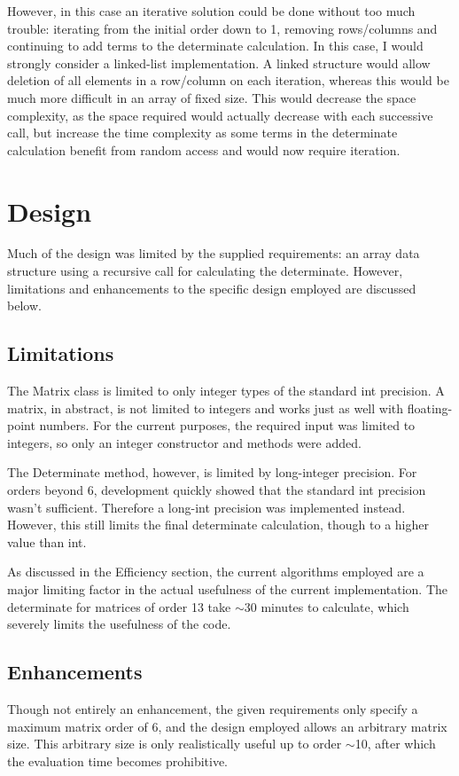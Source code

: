 \documentclass[a4paper,12pt]{article}
\begin{document}
However, in this case an iterative solution could be done without too much trouble: iterating from the initial order down to 1, removing
rows/columns and continuing to add terms to the determinate calculation.  In this case, I would strongly consider a linked-list implementation.  
A linked structure would allow deletion of all elements in a row/column on each iteration, whereas this would be much more difficult in an array of fixed size.  
This would decrease the space complexity, as the space required would actually decrease with each successive call, but increase the
time complexity as some terms in the determinate calculation benefit from random access and would now require iteration. 



\section{Design}
Much of the design was limited by the supplied requirements: an array data structure using a recursive call for calculating the determinate.  However, limitations and enhancements to the specific design employed are discussed below.


\subsection{Limitations}
The Matrix class is limited to only integer types of the standard int precision.  A matrix, in abstract, is not limited to integers and works just as 
well with floating-point numbers.
For the current purposes, the required input was limited to integers, so only an integer constructor and methods were added. 

The Determinate method, however, is limited by long-integer precision.  For orders beyond 6, development quickly showed that
the standard int precision wasn't sufficient.  Therefore a long-int precision was implemented instead.  However, this still limits the final
determinate calculation, though to a higher value than int.  

As discussed in the Efficiency section, the current algorithms employed are a major limiting factor in the actual usefulness of the 
current implementation.  The determinate for matrices of order 13 take $\sim$30 minutes to calculate, which severely limits the usefulness
of the code. 

\subsection{Enhancements}
Though not entirely an enhancement, the given requirements only specify a maximum matrix order of 6, and the design employed
allows an arbitrary matrix size.  This arbitrary size is only realistically useful up to order $\sim$10, after which the evaluation time
becomes prohibitive. 
\end{document}
